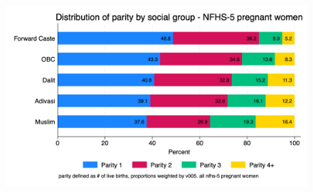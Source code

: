\documentclass{article}
\begin{document}
\maketitle












\begin{figure}[H]
    \centering
    \includegraphics[width=\textwidth]{figures/parity distribution of pregnant women by social group.png}
\end{figure}
\end{document}
